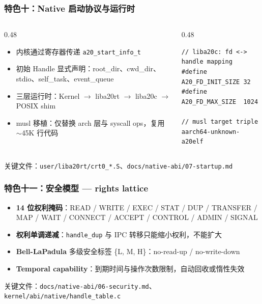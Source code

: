 \documentclass[aspectratio=1610]{beamer}
\newcommand{\code}[1]{\texttt{\footnotesize #1}}
\newcommand{\high}[1]{\textbf{\textcolor{ThemeColor}{#1}}}
\begin{document}
\begin{frame}[fragile]
    \frametitle{特色十：Native 启动协议与运行时}
    \begin{columns}
        \begin{column}{0.48\textwidth}
            \footnotesize
            \begin{itemize}
                \item 内核通过寄存器传递 \code{a20\_start\_info\_t}
                \item 初始 Handle 显式声明：root\_dir、cwd\_dir、stdio、self\_task、event\_queue
                \item 三层运行时：Kernel $\rightarrow$ liba20rt $\rightarrow$ liba20c $\rightarrow$ POSIX shim
                \item musl 移植：仅替换 arch 层与 syscall ops，复用 $\sim$45K 行代码
            \end{itemize}
        \end{column}
        \begin{column}{0.48\textwidth}
            \begin{lstlisting}[basicstyle=\ttfamily\tiny]
// liba20c: fd <-> handle mapping
#define A20_FD_INIT_SIZE 32
#define A20_FD_MAX_SIZE  1024

// musl target triple
aarch64-unknown-a20elf
            \end{lstlisting}
        \end{column}
    \end{columns}
    \vspace{0.3em}
    \small 关键文件：\code{user/liba20rt/crt0\_*.S}、\code{docs/native-abi/07-startup.md}
\end{frame}

\begin{frame}
    \frametitle{特色十一：安全模型 — rights lattice}
    \begin{itemize}
        \item \high{14 位权利掩码}：READ / WRITE / EXEC / STAT / DUP / TRANSFER / MAP / WAIT / CONNECT / ACCEPT / CONTROL / ADMIN / SIGNAL
        \item \high{权利单调递减}：\code{handle\_dup} 与 IPC 转移只能缩小权利，不能扩大
        \item \high{Bell-LaPadula} 多级安全标签 \{L, M, H\}：no-read-up / no-write-down
        \item \high{Temporal capability}：到期时间与操作次数限制，自动回收或惰性失效
    \end{itemize}
    \vspace{0.3em}
    \small 关键文件：\code{docs/native-abi/06-security.md}、\code{kernel/abi/native/handle\_table.c}
\end{frame}
\end{document}

